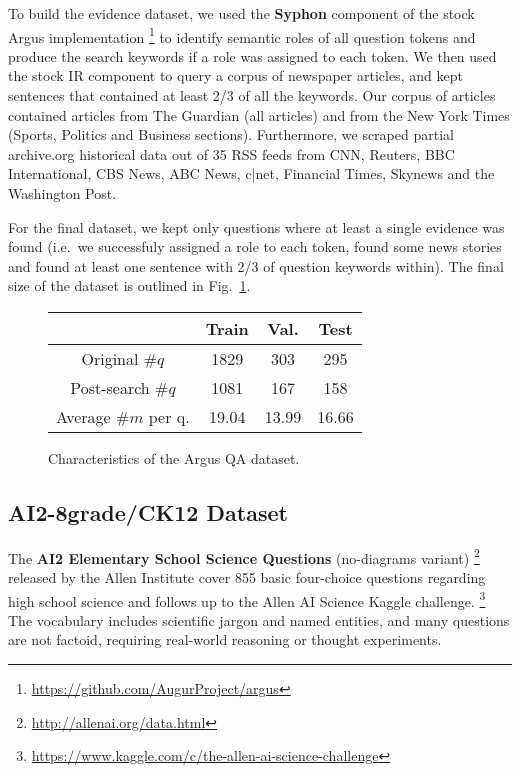\documentclass[11pt]{article}
\begin{document}
To build the evidence dataset, we used the \textbf{Syphon} component
\cite{argus}
of the stock Argus implementation%
\footnote{\url{https://github.com/AugurProject/argus}}
to identify semantic roles of all question tokens and produce
the search keywords if a role was assigned to each token.
We then used the stock IR component to query a corpus of newspaper
articles, and kept sentences that contained at least 2/3 of all
the keywords.
Our corpus of articles contained articles from The Guardian (all articles) and from the New York Times (Sports, Politics and Business sections).  Furthermore, we scraped partial archive.org historical data out of 35 RSS feeds from CNN, Reuters, BBC International, CBS News, ABC News, c|net, Financial Times, Skynews and the Washington Post.

For the final dataset, we kept only questions where at least
a single evidence was found (i.e.\ we successfuly assigned a role
to each token, found some news stories and found at least one
sentence with 2/3 of question keywords within).  The final size
of the dataset is outlined in Fig.~\ref{tab:dataset}.

\begin{figure}
	\centering
	\begin{tabular}{|c|ccc|}
		\hline
		& Train & Val. & Test \\
		\hline
		Original $\#q$ & 1829 & 303 & 295 \\
		Post-search $\#q$ & 1081 & 167 & 158 \\
		Average $\#m$ per q. & 19.04 & 13.99 & 16.66 \\
		\hline
	\end{tabular}
	\vspace*{-0.2cm}
	\caption{\footnotesize%
		Characteristics of the Argus QA dataset.
	}
	\label{tab:dataset}
\end{figure}



\subsection{AI2-8grade/CK12 Dataset}

The \textbf{AI2 Elementary School Science Questions} (no-diagrams variant)%
\footnote{\url{http://allenai.org/data.html}} released by the Allen Institute
cover 855 basic four-choice questions regarding high school science
and follows up to the Allen AI Science Kaggle challenge.%
\footnote{\url{https://www.kaggle.com/c/the-allen-ai-science-challenge}}
The vocabulary includes scientific jargon and named entities, and many questions
are not factoid, requiring real-world reasoning or thought experiments.
\end{document}
